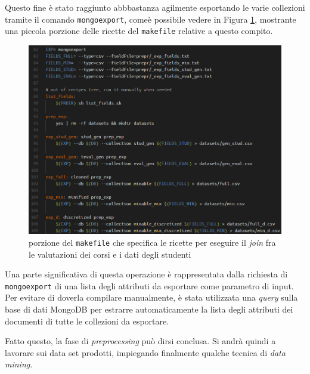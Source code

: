	Questo fine è stato raggiunto abbbastanza agilmente esportando le varie collezioni tramite il comando \texttt{mongoexport}, comeè possibile vedere in Figura \ref{make_export}, mostrante una piccola porzione delle ricette del \texttt{makefile} relative a questo compito. \\

	\begin{figure}
			\centering
			\caption{porzione del \texttt{makefile} che specifica le ricette per eseguire il \textit{join} fra le valutazioni dei corsi e i dati degli studenti}
			\label{make_export}
		\includegraphics[scale=0.35]{img/export.png}
	\end{figure}

	Una parte significativa di questa operazione è rappresentata dalla richiesta di \texttt{mongoexport} di una lista degli attributi da esportare come parametro di input. Per evitare di doverla compilare manualmente, è stata utilizzata una \textit{query} sulla base di dati MongoDB per estrarre automaticamente la lista degli attributi dei documenti di tutte le collezioni da esportare.


	

	\vspace{0.3cm}

	Fatto questo, la fase di \textit{preprocessing} può dirsi conclusa. Si andrà quindi a lavorare sui data set prodotti, impiegando finalmente qualche tecnica di \textit{data mining}.
